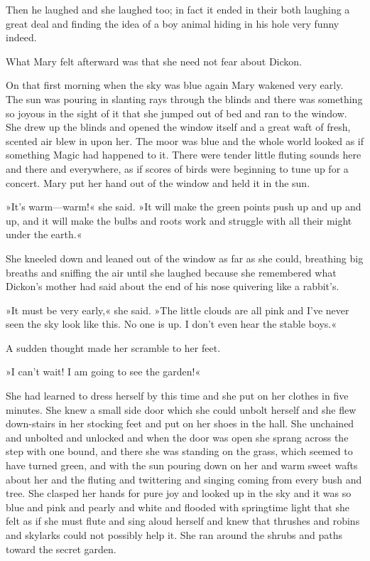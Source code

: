 Then he laughed and she laughed too; in fact it ended in their both laughing a great deal and finding the idea of a boy animal hiding in his hole very funny indeed.

What Mary felt afterward was that she need not fear about Dickon.

On that first morning when the sky was blue again Mary wakened very early. The sun was pouring in slanting rays through the blinds and there was something so joyous in the sight of it that she jumped out of bed and ran to the window. She drew up the blinds and opened the window itself and a great waft of fresh, scented air blew in upon her. The moor was blue and the whole world looked as if something Magic had happened to it. There were tender little fluting sounds here and there and everywhere, as if scores of birds were beginning to tune up for a concert. Mary put her hand out of the window and held it in the sun.

»It's warm—warm!« she said. »It will make the green points push up and up and up, and it will make the bulbs and roots work and struggle with all their might under the earth.«

She kneeled down and leaned out of the window as far as she could, breathing big breaths and sniffing the air until she laughed because she remembered what Dickon's mother had said about the end of his nose quivering like a rabbit's.

»It must be very early,« she said. »The little clouds are all pink and I've never seen the sky look like this. No one is up. I don't even hear the stable boys.«

A sudden thought made her scramble to her feet.

»I can't wait! I am going to see the garden!«

She had learned to dress herself by this time and she put on her clothes in five minutes. She knew a small side door which she could unbolt herself and she flew down-stairs in her stocking feet and put on her shoes in the hall. She unchained and unbolted and unlocked and when the door was open she sprang across the step with one bound, and there she was standing on the grass, which seemed to have turned green, and with the sun pouring down on her and warm sweet wafts about her and the fluting and twittering and singing coming from every bush and tree. She clasped her hands for pure joy and looked up in the sky and it was so blue and pink and pearly and white and flooded with springtime light that she felt as if she must flute and sing aloud herself and knew that thrushes and robins and skylarks could not possibly help it. She ran around the shrubs and paths toward the secret garden.

